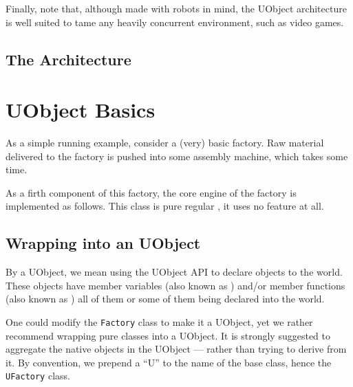 Finally, note that, although made with robots in mind, the UObject
architecture is well suited to tame any heavily concurrent
environment, such as video games.

\subsection{The \urbi Architecture}



\section{UObject Basics}

As a simple running example, consider a (very) basic factory.  Raw
material delivered to the factory is pushed into some assembly machine,
which takes some time.

As a firth component of this factory, the core engine of the factory
is implemented as follows.  This class is pure regular \Cxx, it uses
no \urbi feature at all.

\newcommand{\factoryDir}{\uobjectsDir/factory/factory.uob}



\subsection{Wrapping into an UObject}

By  a UObject, we mean using the UObject API to declare
objects to the \urbi world.  These objects have member variables (also
known as ) and/or member functions (also known as
) all of them or some of them being declared into the
\urbi world.

One could modify the \lstinline|Factory| class to make it a UObject,
yet we rather recommend wrapping pure \Cxx classes into a UObject.  It
is strongly suggested to aggregate the native \Cxx objects in the
UObject --- rather than trying to derive from it.  By convention, we
prepend a ``U'' to the name of the base class, hence the
\lstinline|UFactory| class.

